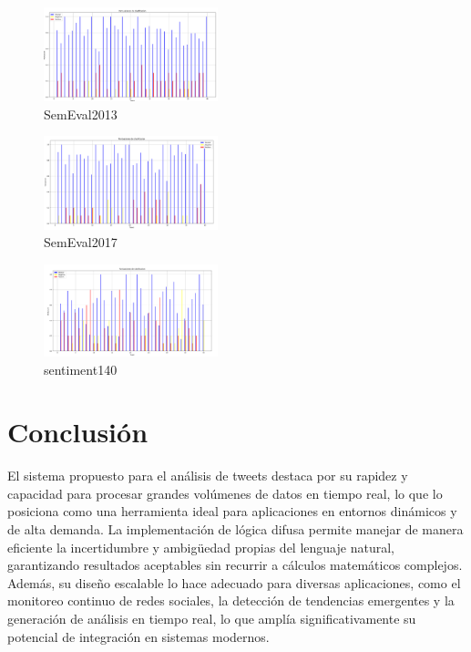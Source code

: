\documentclass[sigconf, review=false, nonacm]{acmart}
\begin{document}
\begin{figure}[ht]
	\centering
	\includegraphics[width=0.45\textwidth]{../results/barras/semeval2013.png}
	\caption{SemEval2013}
	\label{fig:miimagen}
\end{figure}

\begin{figure}[ht]
    \centering
    \includegraphics[width=0.45\textwidth]{../results/barras/semeval2017.png}
    \caption{SemEval2017}
    \label{fig:miimagen}
\end{figure}

\begin{figure}[ht]
    \centering
    \includegraphics[width=0.45\textwidth]{../results/barras/sentiment140.png}
    \caption{sentiment140}
    \label{fig:miimagen}
\end{figure}

\section{Conclusión}
El sistema propuesto para el análisis de tweets destaca por su rapidez y capacidad para procesar grandes
volúmenes de datos en tiempo real, lo que lo posiciona como una herramienta ideal para aplicaciones en
entornos dinámicos y de alta demanda. La implementación de lógica difusa permite manejar de manera eficiente
la incertidumbre y ambigüedad propias del lenguaje natural, garantizando resultados aceptables sin recurrir a
cálculos matemáticos complejos. Además, su diseño escalable lo hace adecuado para diversas aplicaciones, como
el monitoreo continuo de redes sociales, la detección de tendencias emergentes y la generación de análisis en
tiempo real, lo que amplía significativamente su potencial de integración en sistemas modernos.

\nocite{libro}


\end{document}

